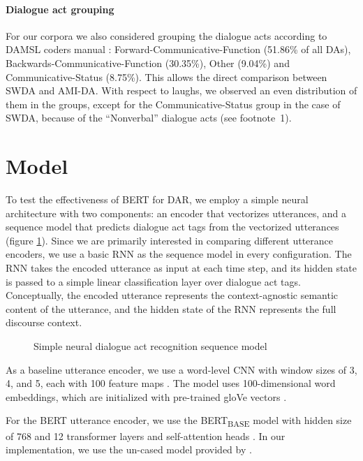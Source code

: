 \documentclass[11pt,a4paper]{article}
\begin{document}
\paragraph{Dialogue act grouping}
For our corpora we also considered grouping the dialogue acts according to DAMSL coders manual \citep{jurafskySwitchboardSWBDDAMSLShallowDiscourseFunction1997a}: Forward-Communicative-Function (51.86\% of all DAs), Backwards-Communicative-Function (30.35\%), Other (9.04\%) and Communicative-Status (8.75\%).
This allows the direct comparison between SWDA and AMI-DA.
With respect to laughs, we observed an even distribution of them in the groups, except for the Communicative-Status group in the case of SWDA, because of the ``Nonverbal'' dialogue acts (see footnote~1).
  
\section{Model} %

To test the effectiveness of BERT for DAR, we employ a simple neural architecture with two components: an encoder that vectorizes utterances, and a sequence model that predicts dialogue act tags from the vectorized utterances (figure \ref{fig:model-architecture}).
Since we are primarily interested in comparing different utterance encoders, we use a basic RNN as the sequence model in every configuration. 
The RNN takes the encoded utterance as input at each time step,
and its hidden state is passed to a simple linear classification layer over dialogue act tags.
Conceptually, the encoded utterance represents the context-agnostic semantic content of the utterance, and the hidden state of the RNN represents the full discourse context.

\begin{figure}
  
  \caption{Simple neural dialogue act recognition sequence model}
  \label{fig:model-architecture}
\end{figure}

As a baseline utterance encoder, we use a word-level CNN with window sizes of 3, 4, and 5, each with 100 feature maps \citep{kimConvolutionalNeuralNetworks2014}. 
The model uses 100-dimensional word embeddings, which are initialized with pre-trained gloVe vectors \citep{penningtonGloveGlobalVectors2014}.

For the BERT utterance encoder, we use the BERT\textsubscript{BASE} model with hidden size of 768 and 12 transformer layers and self-attention heads \citep[][\S3.1]{devlinBERTPretrainingDeep2018}.
In our implementation, we use the un-cased model provided by \citet{wolfHuggingFaceTransformersStateoftheart2019}.
\end{document}
